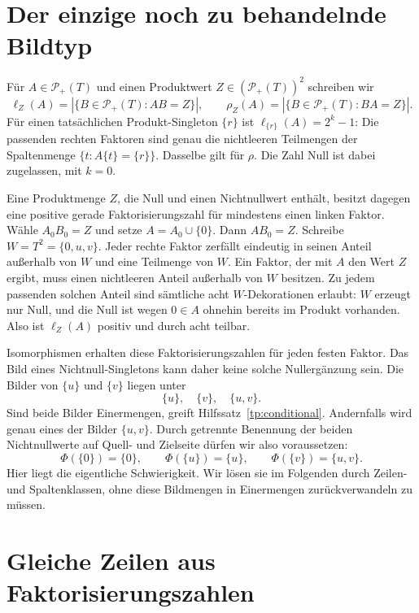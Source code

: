 \documentclass[a4paper,11pt]{article}
\newcommand{\Pp}[1]{\mathcal P_+(#1)}
\theoremstyle{remark}
\begin{document}
\section{Der einzige noch zu behandelnde Bildtyp}

Für \(A\in\Pp T\) und einen Produktwert \(Z\in(\Pp T)^2\)
schreiben wir
\[
 \ell_Z(A)=|\{B\in\Pp T:AB=Z\}|,\qquad
 \rho_Z(A)=|\{B\in\Pp T:BA=Z\}|.
\]
Für einen tatsächlichen Produkt-Singleton \(\{r\}\) ist
\(\ell_{\{r\}}(A)=2^k-1\): Die passenden rechten Faktoren
sind genau die nichtleeren Teilmengen der Spaltenmenge
\(\{t:A\{t\}=\{r\}\}\). Dasselbe gilt für \(\rho\).
Die Zahl Null ist dabei zugelassen, mit \(k=0\).

Eine Produktmenge \(Z\), die Null und einen Nichtnullwert enthält,
besitzt dagegen eine positive gerade Faktorisierungszahl für mindestens
einen linken Faktor. Wähle \(A_0B_0=Z\) und setze
\(A=A_0\cup\{0\}\). Dann \(AB_0=Z\).
Schreibe \(W=T^2=\{0,u,v\}\). Jeder rechte Faktor zerfällt
eindeutig in seinen Anteil außerhalb von \(W\) und eine Teilmenge
von \(W\). Ein Faktor, der mit \(A\) den Wert \(Z\) ergibt,
muss einen nichtleeren Anteil außerhalb von \(W\) besitzen.
Zu jedem passenden solchen Anteil sind sämtliche acht
\(W\)-Dekorationen erlaubt: \(W\) erzeugt nur Null, und die
Null ist wegen \(0\in A\) ohnehin bereits im Produkt vorhanden.
Also ist \(\ell_Z(A)\) positiv und durch acht teilbar.

Isomorphismen erhalten diese Faktorisierungszahlen für jeden festen
Faktor. Das Bild eines Nichtnull-Singletons kann daher keine solche
Nullergänzung sein. Die Bilder von \(\{u\}\) und \(\{v\}\)
liegen unter
\[
 \{u\},\quad\{v\},\quad\{u,v\}.
\]
Sind beide Bilder Einermengen, greift
Hilfssatz~\ref{tp:conditional}. Andernfalls wird genau eines der
Bilder \(\{u,v\}\). Durch getrennte Benennung der beiden
Nichtnullwerte auf Quell- und Zielseite dürfen wir also voraussetzen:
\begin{equation}\label{tp:normalform}
 \Phi(\{0\})=\{0\},\qquad
 \Phi(\{u\})=\{u\},\qquad
 \Phi(\{v\})=\{u,v\}.
\end{equation}
Hier liegt die eigentliche Schwierigkeit. Wir lösen sie im Folgenden
durch Zeilen- und Spaltenklassen, ohne diese Bildmengen in Einermengen
zurückverwandeln zu müssen.

\section{Gleiche Zeilen aus Faktorisierungszahlen}
\end{document}
